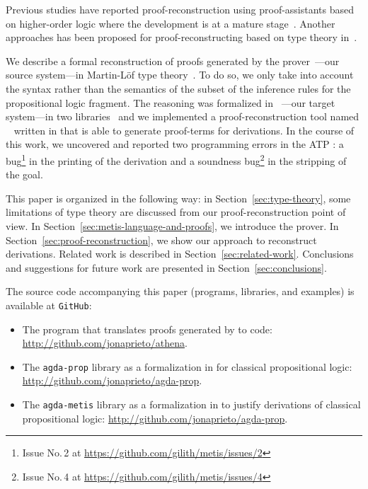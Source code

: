 \documentclass[../paper.tex]{subfiles}
\begin{document}
Previous studies have reported proof-reconstruction using
proof-assistants based on higher-order logic where the development is at a mature
stage~\cite{paulson2010three,hurlin07practical,kaliszyk2013}.
Another approaches has been proposed for proof-reconstructing based
on type theory in~\cite{Bezem2002,kanso2016light,Keller2013}.

We describe a formal reconstruction of proofs generated by the \Metis
prover~\cite{hurd2003first}---our source system---in Martin-Löf type
theory~\cite{Nordstrom-Petersson-Smith-1990}. To do so, we only  take
into account the syntax rather than the semantics of the subset of the
\Metis inference rules for the propositional logic fragment. The
\Metis reasoning was formalized in \Agda~\cite{agdateam}---our target
system---in two libraries~\cite{AgdaProp,AgdaMetis} and we implemented
a proof-reconstruction tool named \Athena~\cite{Athena} written in
\Haskell that is able to generate \Agda proof-terms for \Metis
derivations.  In the course of this work, we uncovered and reported
two programming errors in the ATP \Metis: a bug\footnote{Issue No.\,2
at \url{https://github.com/gilith/metis/issues/2}} in the printing of
the derivation and a soundness bug\footnote{Issue No.\,4 at
\url{https://github.com/gilith/metis/issues/4}} in the stripping of
the goal.


This paper is organized in the following way: in
Section~\ref{sec:type-theory}, some limitations of type theory are
discussed from our proof-reconstruction point of view.  In
Section~\ref{sec:metis-language-and-proofs}, we introduce the \Metis
prover.  In Section~\ref{sec:proof-reconstruction}, we show our
approach to reconstruct \Metis derivations.  Related work is described
in Section~\ref{sec:related-work}.  Conclusions and suggestions for
future work are presented in Section~\ref{sec:conclusions}.

The source code accompanying this paper (programs, libraries, and
examples) is available at \verb!GitHub!:

\begin{itemize}
  \item The \Athena program that translates proofs generated by \Metis
  to \Agda code: \url{http://github.com/jonaprieto/athena}.

  \item The \verb!agda-prop! library as a formalization in \Agda for
    classical propositional logic:
  \url{http://github.com/jonaprieto/agda-prop}.

  \item The \verb!agda-metis! library as a formalization in \Agda to
  justify \Metis derivations of classical propositional logic:
  \url{http://github.com/jonaprieto/agda-prop}.
\end{itemize}
\end{document}
